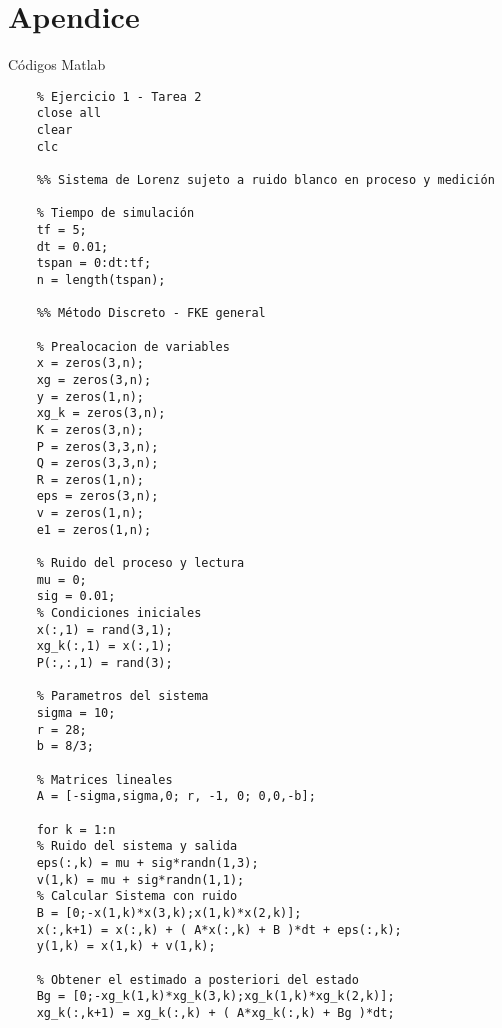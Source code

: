 \section*{Apendice\label{section:conclusion}}

\begin{Large}
Códigos Matlab
\end{Large}

	\begin{verbatim}
	% Ejercicio 1 - Tarea 2
	close all
	clear
	clc
	
	%% Sistema de Lorenz sujeto a ruido blanco en proceso y medición
	
	% Tiempo de simulación
	tf = 5;
	dt = 0.01;
	tspan = 0:dt:tf;
	n = length(tspan);
	
	%% Método Discreto - FKE general
	
	% Prealocacion de variables
	x = zeros(3,n);                                                          
	xg = zeros(3,n);                                                            
	y = zeros(1,n);                                                            
	xg_k = zeros(3,n);                                                         
	K = zeros(3,n);                                                            
	P = zeros(3,3,n);                                                          
	Q = zeros(3,3,n);                                                      
	R = zeros(1,n);                                                        
	eps = zeros(3,n);                                                         
	v = zeros(1,n);                                                            
	e1 = zeros(1,n);                                                          
	
	% Ruido del proceso y lectura
	mu = 0;                                                                  
	sig = 0.01;                                                              
	% Condiciones iniciales
	x(:,1) = rand(3,1);
	xg_k(:,1) = x(:,1);
	P(:,:,1) = rand(3);
	
	% Parametros del sistema
	sigma = 10;
	r = 28;
	b = 8/3;
	
	% Matrices lineales
	A = [-sigma,sigma,0; r, -1, 0; 0,0,-b];
	
	for k = 1:n
	% Ruido del sistema y salida
	eps(:,k) = mu + sig*randn(1,3);
	v(1,k) = mu + sig*randn(1,1);
	% Calcular Sistema con ruido
	B = [0;-x(1,k)*x(3,k);x(1,k)*x(2,k)];
	x(:,k+1) = x(:,k) + ( A*x(:,k) + B )*dt + eps(:,k);
	y(1,k) = x(1,k) + v(1,k);
	
	% Obtener el estimado a posteriori del estado
	Bg = [0;-xg_k(1,k)*xg_k(3,k);xg_k(1,k)*xg_k(2,k)];
	xg_k(:,k+1) = xg_k(:,k) + ( A*xg_k(:,k) + Bg )*dt;
	

\end{verbatim}
